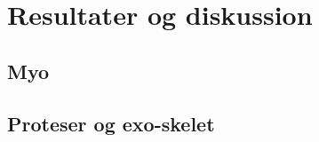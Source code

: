 \thispagestyle{fancy}
\chapter{Resultater og diskussion}
\label{chp:resultaterogdisk}

\section{Myo}

\section{Proteser og exo-skelet}